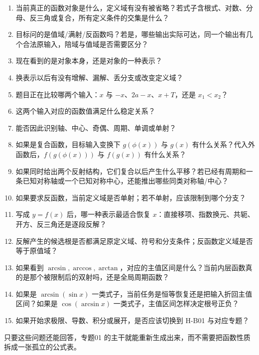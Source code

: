 \documentclass[11pt,a4paper]{ctexart}
\providecommand{\tightlist}{}
\begin{document}
\begin{enumerate}
\def\labelenumi{\arabic{enumi}.}
\tightlist
\item
  当前真正的函数对象是什么，定义域有没有被省略？若式子含根式、对数、分母、反三角或复合，所有定义条件的交集是什么？
\item
  目标问的是值域/满射/反函数吗？若是，哪些输出实际可达，同一个输出有几个合法原输入，陪域与值域是否需要区分？
\item
  现在看到的是对象本身，还是对象的一种表示？
\item
  换表示以后有没有增解、漏解、丢分支或改变定义域？
\item
  题目正在比较哪两个输入：\(x\) 与 \(-x\)、\(2a-x\)、\(x+T\)，还是
  \(x_1<x_2\)？
\item
  这两个输入对应的函数值满足什么稳定关系？
\item
  能否因此识别轴、中心、奇偶、周期、单调或单射？
\item
  如果是复合函数，目标输入变换下 $g(\phi(x))$ 与 $g(x)$ 有什么关系？代入外函数后，$f(g(\phi(x)))$ 与 $f(g(x))$ 有什么关系？
\item
  如果同时给出两个反射结构，它们复合以后产生什么平移？若已经有周期和一条已知对称轴或一个已知对称中心，还能推出哪些同类对称轴/中心？
\item
  如果要求反函数，当前定义域是否单射；若不单射，应该限制到哪个分支？
\item
  写成 \(y=f(x)\) 后，哪一种表示最适合恢复 \(x\)：直接移项、指数换元、共轭、开方、反三角还是逐段反解？
\item
  反解产生的候选根是否都满足原定义域、符号和分支条件；反函数定义域是否等于原值域？
\item
  如果看到 \(\arcsin,\arccos,\arctan\)，对应的主值区间是什么？当前内层函数真的是那个被限制后的双射吗，还是全局周期函数？
\item
  如果是 \(\arcsin(\sin x)\) 一类式子，当前任务是恒等恢复还是把输入折回主值区间？如果是 \(\cos(\arcsin x)\) 一类式子，主值区间怎样决定根号正负？
\item
  如果开始求极限、导数、积分或展开，是否应该切换到 H-B01 与对应专题？
\end{enumerate}

只要这些问题还能回答，专题01
 的主干就能重新生成出来，而不需要把函数性质拆成一张孤立的公式表。
\end{document}
